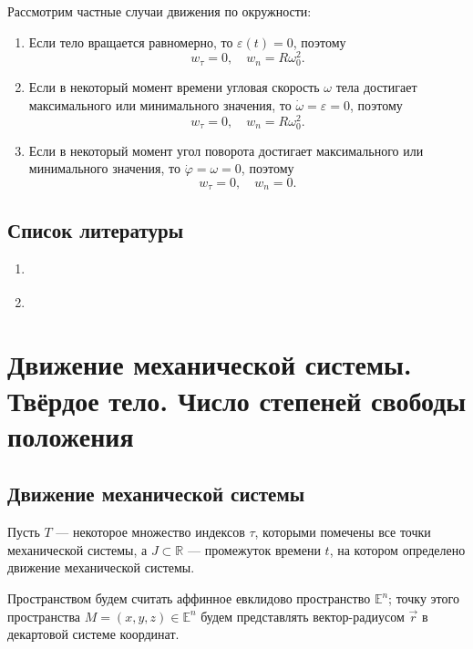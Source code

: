 \documentclass{article}
\theoremstyle{definition}
\theoremstyle{plain}
\theoremstyle{remark}
\numberwithin{equation}{section}
\begin{document}
Рассмотрим частные случаи движения по окружности:
\begin{enumerate}
  \item Если тело вращается равномерно, то $\varepsilon(t) = 0$, поэтому
    \begin{equation*}
      w_\tau = 0, \quad w_n = R \omega_0^2.
    \end{equation*}

  \item Если в некоторый момент времени угловая скорость $\omega$ тела достигает
    максимального или минимального значения, то
    $\dot{\omega} = \varepsilon = 0$, поэтому
    \begin{equation*}
      w_\tau = 0, \quad w_n = R \omega_0^2.
    \end{equation*}

  \item Если в некоторый момент угол поворота достигает максимального или
    минимального значения, то $\dot{\varphi} = \omega = 0$, поэтому
    \begin{equation*}
      w_\tau = 0, \quad w_n = 0.
    \end{equation*}
\end{enumerate}

\subsection{Список литературы}
\begin{enumerate}
  \item \cite{lectures}
  \item \cite{lourie}
\end{enumerate}

\pagebreak


\section{Движение механической системы. Твёрдое тело. Число степеней свободы
положения}

\subsection{Движение механической системы}

Пусть $T$ --- некоторое множество индексов $\tau$, которыми помечены все точки
механической системы, а $J \subset \mathbb{R}$ --- промежуток времени $t$, на
котором определено движение механической системы.

Пространством будем считать аффинное евклидово пространство $\mathbb{E}^n$;
точку этого пространства $M = (x,y,z) \in \mathbb{E}^n$ будем представлять
вектор-радиусом $\vec{r}$ в декартовой системе координат.
\end{document}
